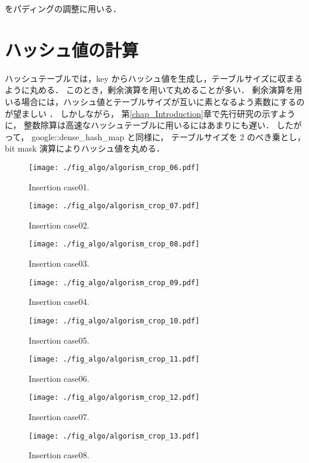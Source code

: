 をパディングの調整に用いる．

\section{ハッシュ値の計算}

ハッシュテーブルでは，key からハッシュ値を生成し，テーブルサイズに収まるように丸める．
このとき，剰余演算を用いて丸めることが多い．
剰余演算を用いる場合には，ハッシュ値とテーブルサイズが互いに素となるよう素数にするのが望ましい \citep{石畑1989}．
しかしながら，
第\ref{chap_Introduction}章で先行研究の示すように，
整数除算は高速なハッシュテーブルに用いるにはあまりにも遅い．
したがって，
google::dense\_hash\_map と同様に，
テーブルサイズを 2 のべき乗とし，
bit mask 演算によりハッシュ値を丸める．


\begin{figure}[h]
  \texttt{[image: ./fig\_algo/algorism\_crop\_06.pdf]}
  \caption{ Insertion case01. }
  \label{fig_IpCHashT_insert_hard_case01}

  \texttt{[image: ./fig\_algo/algorism\_crop\_07.pdf]}
  \caption{ Insertion case02. }
  \label{fig_IpCHashT_insert_hard_case02}

  \texttt{[image: ./fig\_algo/algorism\_crop\_08.pdf]}
  \caption{ Insertion case03. }
  \label{fig_IpCHashT_insert_hard_case03}

  \texttt{[image: ./fig\_algo/algorism\_crop\_09.pdf]}
  \caption{ Insertion case04. }
  \label{fig_IpCHashT_insert_hard_case04}
\end{figure}

\begin{figure}[h]
  \texttt{[image: ./fig\_algo/algorism\_crop\_10.pdf]}
  \caption{ Insertion case05. }
  \label{fig_IpCHashT_insert_hard_case05}

  \texttt{[image: ./fig\_algo/algorism\_crop\_11.pdf]}
  \caption{ Insertion case06. }
  \label{fig_IpCHashT_insert_hard_case06}

  \texttt{[image: ./fig\_algo/algorism\_crop\_12.pdf]}
  \caption{ Insertion case07. }
  \label{fig_IpCHashT_insert_hard_case07}

  \texttt{[image: ./fig\_algo/algorism\_crop\_13.pdf]}
  \caption{ Insertion case08. }
  \label{fig_IpCHashT_insert_hard_case08}
\end{figure}

